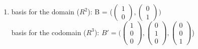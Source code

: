 \documentclass[notitlepage]{math}
\begin{document}
\begin{enumerate}[label=\protect\circled{\arabic*}]
    \item basis for the domain ($R^2$): B = ($\begin{pmatrix} 1 \\ 0 \end{pmatrix}, \begin{pmatrix} 0 \\ 1 \end{pmatrix})$\\
    basis for the codomain ($R^3$): $B' = (\begin{pmatrix} 1 \\ 0 \\ 0 \end{pmatrix}, \begin{pmatrix} 0 \\ 1 \\ 0 \end{pmatrix}, \begin{pmatrix} 0 \\ 0 \\ 1 \end{pmatrix}$)


\end{enumerate}
\end{document}
